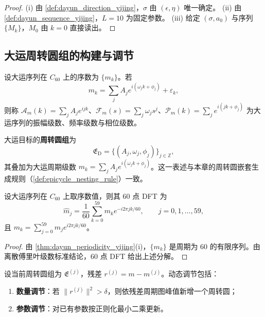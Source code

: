 \begin{proof}
(i) 由 \cref{def:dayun_direction_yijing}，$\sigma$ 由 $(\epsilon,\eta)$ 唯一确定。
(ii) 由 \cref{def:dayun_sequence_yijing}，$L=10$ 为固定参数。
(iii) 给定 $(\sigma,a_0)$ 与序列 $\{M_k\}$，$M_0$ 由 $k=0$ 直接读出。
\end{proof}

\subsection{大运周转圆组的构建与调节}

\begin{definition}\label{def:dayun_series_yijing}
设大运序列在 $C_{60}$ 上的序数为 $\{m_k\}$。若
\[
m_k=\sum_{j}A_j e^{i(\omega_j k+\phi_j)}+\varepsilon_k,
\]
则称 $\mathcal A_m(k)=\sum_j A_j e^{ijk}$、$\mathcal F_m(s)=\sum_j\omega_j s^j$、$\mathcal P_m(k)=\sum_j e^{i(jk+\phi_j)}$ 为大运序列的振幅级数、频率级数与相位级数。
\end{definition}

\begin{definition}[大运周转圆组]\label{def:dayun_epicycle_group_yijing}
大运目标的\textbf{周转圆组}为
\[
\mathfrak E_{\mathrm{D}}=\{(A_j,\omega_j,\phi_j)\}_{j\in\mathbb Z},
\]
其叠加为大运周期级数 $m_k=\sum_j A_j e^{i(\omega_j k+\phi_j)}$。这一表述与本章的周转圆嵌套生成规则（\cref{def:epicycle_nesting_rule}）一致。
\end{definition}

\begin{proposition}[大运序列的傅里叶展开]\label{prop:dayun_fourier_yijing}
设大运序列在 $C_{60}$ 上取序数值，则其 $60$ 点 DFT 为
\[
\hat m_j=\frac{1}{60}\sum_{k=0}^{59}m_k e^{-i2\pi jk/60},\qquad j=0,1,\dots,59,
\]
且 $m_k=\sum_{j=0}^{59}\hat m_j e^{i2\pi jk/60}$。
\end{proposition}

\begin{proof}
由 \cref{thm:dayun_periodicity_yijing}(i)，$\{m_k\}$ 是周期为 $60$ 的有限序列。由离散傅里叶级数标准结论，$60$ 点 DFT 给出上述分解。
\end{proof}

\begin{definition}[大运周转圆组的动态调节]\label{def:dayun_adaptive_yijing}
设当前周转圆组为 $\mathfrak E^{(j)}$，残差 $r^{(j)}=m-m^{(j)}$。动态调节包括：
\begin{enumerate}[label=(\roman*)]
    \item \textbf{数量调节}：若 $\|r^{(j)}\|^2>\delta$，则依残差周期图峰值新增一个周转圆；
    \item \textbf{参数调节}：对已有参数按正则化最小二乘更新。
\end{enumerate}
\end{definition}

